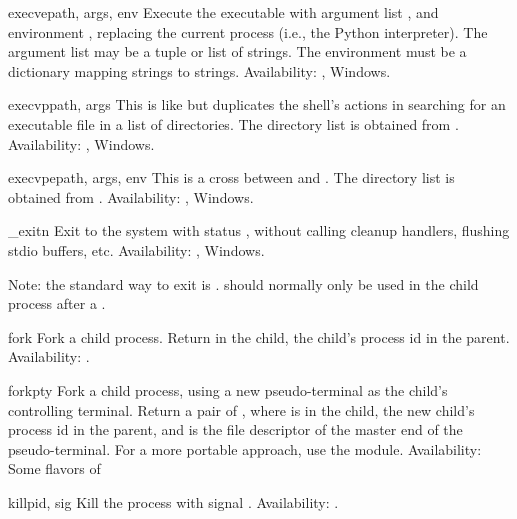 \begin{funcdesc}{execve}{path, args, env}
Execute the executable  with argument list ,
and environment ,
replacing the current process (i.e., the Python interpreter).
The argument list may be a tuple or list of strings.
The environment must be a dictionary mapping strings to strings.
Availability: \UNIX{}, Windows.
\end{funcdesc}

\begin{funcdesc}{execvp}{path, args}
This is like  but duplicates
the shell's actions in searching for an executable file in a list of
directories.  The directory list is obtained from
.
Availability: \UNIX{}, Windows.
\end{funcdesc}

\begin{funcdesc}{execvpe}{path, args, env}
This is a cross between  and .
The directory list is obtained from .
Availability: \UNIX{}, Windows.
\end{funcdesc}

\begin{funcdesc}{_exit}{n}
Exit to the system with status , without calling cleanup
handlers, flushing stdio buffers, etc.
Availability: \UNIX{}, Windows.

Note: the standard way to exit is .
 should normally only be used in the child process
after a .
\end{funcdesc}

\begin{funcdesc}{fork}{}
Fork a child process.  Return  in the child, the child's
process id in the parent.
Availability: \UNIX{}.
\end{funcdesc}

\begin{funcdesc}{forkpty}{}
Fork a child process, using a new pseudo-terminal as the child's
controlling terminal. Return a pair of ,
where  is  in the child, the new child's process id
in the parent, and  is the file descriptor of the master end
of the pseudo-terminal.  For a more portable approach, use the
 module.
Availability: Some flavors of \UNIX{}
\end{funcdesc}

\begin{funcdesc}{kill}{pid, sig}
Kill the process  with signal .
Availability: \UNIX{}.
\end{funcdesc}

